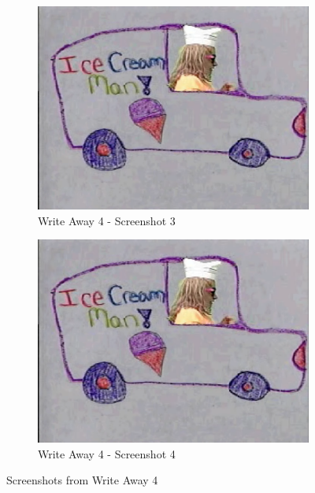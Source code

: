 \begin{figure}[H]
    \begin{subfigure}{0.45\textwidth}
        \centering
        \includegraphics[width=\linewidth]{Games/WriteAway/Images/WriteAway4Screenshot2.png}
        \caption{Write Away 4 - Screenshot 3}
    \end{subfigure}
    \begin{subfigure}{0.45\textwidth}
        \centering
        \includegraphics[width=\linewidth]{Games/WriteAway/Images/WriteAway4Screenshot2.png}
        \caption{Write Away 4 - Screenshot 4}
    \end{subfigure}
    \caption{Screenshots from Write Away 4}
\end{figure}
